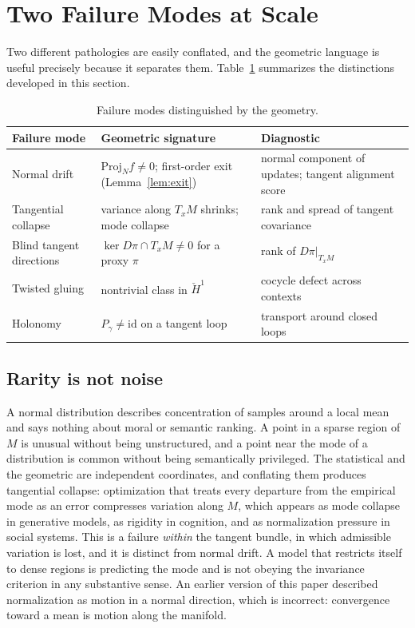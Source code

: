 \documentclass[11pt,a4paper]{article}
\theoremstyle{definition}
\theoremstyle{remark}
\newcommand{\Proj}{\mathrm{Proj}}
\newcommand{\TM}[1]{T_{#1}M}
\begin{document}
\section{Two Failure Modes at Scale}\label{sec:failure}

Two different pathologies are easily conflated, and the geometric language
is useful precisely because it separates them. Table~\ref{tab:modes}
summarizes the distinctions developed in this section.

\begin{table}[ht]
\centering
\caption{Failure modes distinguished by the geometry.}\label{tab:modes}
\begin{tabular}{@{}p{3.1cm}p{4.3cm}p{4.9cm}@{}}
\toprule
Failure mode & Geometric signature & Diagnostic \\
\midrule
Normal drift & $\Proj_N f\ne0$; first-order exit (Lemma~\ref{lem:exit}) & normal component of updates; tangent alignment score \\
Tangential collapse & variance along $\TM{x}$ shrinks; mode collapse & rank and spread of tangent covariance \\
Blind tangent directions & $\ker D\pi\cap\TM{x}\ne0$ for a proxy $\pi$ & rank of $D\pi|_{\TM{x}}$ \\
Twisted gluing & nontrivial class in $\check H^1$ & cocycle defect across contexts \\
Holonomy & $P_\gamma\ne\mathrm{id}$ on a tangent loop & transport around closed loops \\
\bottomrule
\end{tabular}
\end{table}

\subsection{Rarity is not noise}

A normal distribution describes concentration of samples around a local
mean and says nothing about moral or semantic ranking. A point in a sparse
region of $M$ is unusual without being unstructured, and a point near the
mode of a distribution is common without being semantically privileged.
The statistical and the geometric are independent coordinates, and
conflating them produces tangential collapse: optimization that treats every
departure from the empirical mode as an error compresses variation along
$M$, which appears as mode collapse in generative models, as rigidity in
cognition, and as normalization pressure in social systems. This is a
failure \emph{within} the tangent bundle, in which admissible variation is
lost, and it is distinct from normal drift. A model that restricts itself to
dense regions is predicting the mode and is not obeying the invariance
criterion in any substantive sense. An earlier version of this paper
described normalization as motion in a normal direction, which is incorrect:
convergence toward a mean is motion along the manifold.
\end{document}
